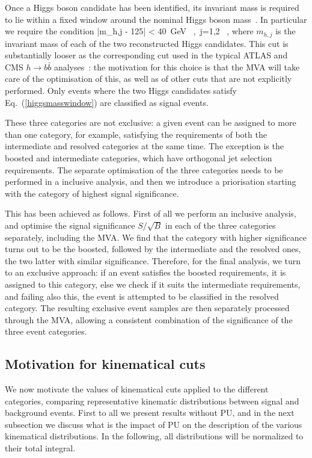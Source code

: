 Once a Higgs boson candidate has been identified,
its invariant mass is required to lie within a fixed window
around the nominal Higgs boson mass~\cite{Aad:2015zhl}.
%
In particular we require the condition
\be
\label{higgsmasswindow}
|m_{h,j} - 125| < 40~{\rm GeV} \, ,\, j=1,2 \, ,
\ee
where $m_{h,j}$ is the invariant mass of each of the two reconstructed  Higgs candidates.
%
This cut is substantially looser as the corresponding
cut used in the typical ATLAS and CMS $h\to b\bar{b}$
analyses~\cite{Aad:2012gxa,Chatrchyan:2013zna}: the motivation
for this choice is that the MVA will take care of the optimisation of this,
as well as of other cuts that are not explicitly performed.
%
Only events where the two Higgs candidates satisfy
Eq.~(\ref{higgsmasswindow}) are classified as signal events.
%

These three categories are not exclusive:
a given event can be assigned to more than one category, for
example, satisfying the requirements of both the intermediate
and resolved
categories at the same time.
%
The exception is the boosted and intermediate categories, which have
orthogonal jet selection requirements.
%
The separate optimisation of the three categories needs to be performed in
a inclusive analysis, and then we introduce a
 priorisation starting with the category of highest signal significance.


 This has been achieved as follows.
First of all we perform an inclusive analysis, and optimise the
signal significance
$S/\sqrt{B}$ in each of the three categories separately, including
the MVA.
%
We find that the category with higher significance turns out to be the boosted,
followed by the intermediate and the resolved ones, the two latter
with similar significance.
%
Therefore, for the final analysis, we turn to an exclusive approach:
if an event satisfies the boosted requirements, it is assigned to
this category, else we check if it suits the intermediate
requirements, and failing also this, the event is attempted to
be classified in the
resolved category.
%
The resulting exclusive event samples are then separately processed
through the MVA, allowing a consistent combination
of the significance of the three event categories.


\subsection{Motivation for kinematical cuts}

We now motivate the values of
kinematical cuts applied to the different categories, 
comparing representative kinematic distributions between
signal and background events.
%
First to all we present results without PU, and in the next
subsection we discuss what is the impact of PU
on the description of the various kinematical
distributions.
%
In the following, all
distributions will be normalized to their total integral.


